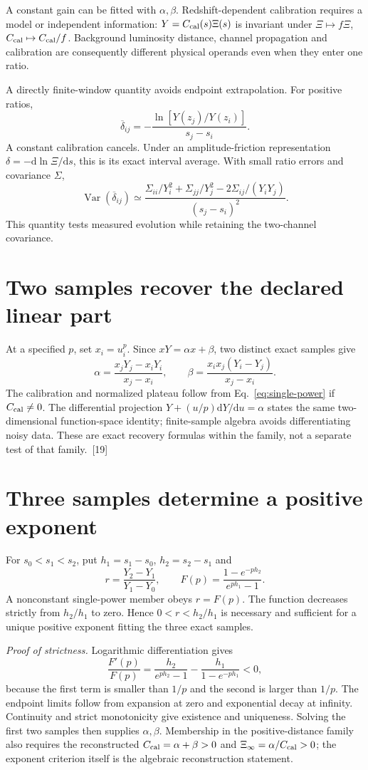 \documentclass[10pt,twocolumn,letterpaper]{article}
\newcommand{\dd}{\mathrm{d}}
\newcommand{\Var}{\operatorname{Var}}
\begin{document}
A constant gain can be fitted with $\alpha,\beta$. Redshift-dependent calibration requires a model or independent information: $Y=C_{\rm cal}(s)\Xi(s)$ is invariant under $\Xi\mapsto f\Xi$, $C_{\rm cal}\mapsto C_{\rm cal}/f$. Background luminosity distance, channel propagation and calibration are consequently different physical operands even when they enter one ratio.

A directly finite-window quantity avoids endpoint extrapolation. For positive ratios,
\[
 \overline\delta_{ij}=-\frac{\ln[Y(z_j)/Y(z_i)]}{s_j-s_i}.
\]
A constant calibration cancels. Under an amplitude-friction representation $\delta=-\dd\ln\Xi/\dd s$, this is its exact interval average. With small ratio errors and covariance $\Sigma$,
\[
 \Var(\overline\delta_{ij})\simeq
 \frac{\Sigma_{ii}/Y_i^2+\Sigma_{jj}/Y_j^2-2\Sigma_{ij}/(Y_iY_j)}{(s_j-s_i)^2}.
\]
This quantity tests measured evolution while retaining the two-channel covariance.

\section{Two samples recover the declared linear part}
At a specified $p$, set $x_i=u_i^p$. Since $xY=\alpha x+\beta$, two distinct exact samples give
\[
 \alpha=\frac{x_jY_j-x_iY_i}{x_j-x_i},\qquad
 \beta=\frac{x_ix_j(Y_i-Y_j)}{x_j-x_i}.
\]
The calibration and normalized plateau follow from Eq.~\eqref{eq:single-power} if $C_{\rm cal}\ne 0$. The differential projection $Y+(u/p)\dd Y/\dd u=\alpha$ states the same two-dimensional function-space identity; finite-sample algebra avoids differentiating noisy data. These are exact recovery formulas within the family, not a separate test of that family.~[19]

\section{Three samples determine a positive exponent}
For $s_0<s_1<s_2$, put $h_1=s_1-s_0$, $h_2=s_2-s_1$ and
\[
 r=\frac{Y_2-Y_1}{Y_1-Y_0},\qquad
 F(p)=\frac{1-e^{-ph_2}}{e^{ph_1}-1}.
\]
A nonconstant single-power member obeys $r=F(p)$. The function decreases strictly from $h_2/h_1$ to zero. Hence $0<r<h_2/h_1$ is necessary and sufficient for a unique positive exponent fitting the three exact samples.

\noindent\textit{Proof of strictness.} Logarithmic differentiation gives
\[
 \frac{F'(p)}{F(p)}=
 \frac{h_2}{e^{ph_2}-1}-\frac{h_1}{1-e^{-ph_1}}<0,
\]
because the first term is smaller than $1/p$ and the second is larger than $1/p$. The endpoint limits follow from expansion at zero and exponential decay at infinity. Continuity and strict monotonicity give existence and uniqueness. Solving the first two samples then supplies $\alpha,\beta$. Membership in the positive-distance family also requires the reconstructed $C_{\rm cal}=\alpha+\beta>0$ and $\Xi_\infty=\alpha/C_{\rm cal}>0$; the exponent criterion itself is the algebraic reconstruction statement.
\end{document}
